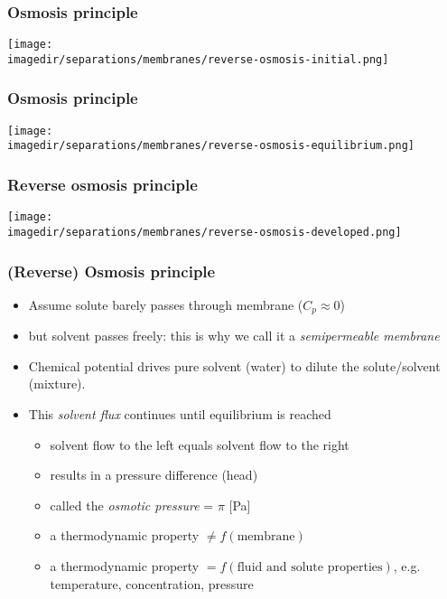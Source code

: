 \begin{frame}\frametitle{Osmosis principle}
	\vfill
	\begin{center}
		\texttt{[image: \\imagedir/separations/membranes/reverse-osmosis-initial.png]}
	\end{center}
\end{frame}

\begin{frame}\frametitle{Osmosis principle}
	\vfill
	\begin{center}
		\texttt{[image: \\imagedir/separations/membranes/reverse-osmosis-equilibrium.png]}
	\end{center}
\end{frame}

\begin{frame}\frametitle{\textbf{{\color{myOrange}Reverse}} osmosis principle}
	\vfill
	\begin{center}
		\texttt{[image: \\imagedir/separations/membranes/reverse-osmosis-developed.png]}
	\end{center}
\end{frame}

\begin{frame}\frametitle{(Reverse) Osmosis principle}
	\begin{itemize}
		\item	Assume solute barely passes through membrane ($C_p \approx 0$)
		\item	but solvent passes freely: this is why we call it a {\color{purple}\emph{semipermeable membrane}}
		\item	Chemical potential drives pure solvent (water) to dilute the solute/solvent (mixture).
		\item	This \emph{solvent flux} continues until equilibrium is reached
			\begin{itemize}
				\item	solvent flow to the left equals solvent flow to the right
				\item	results in a pressure difference (head)
				\item	called the \emph{osmotic pressure} = $\pi$ [Pa]
				\item	a thermodynamic property $\neq f(\text{membrane})$
				\item	a thermodynamic property $= f(\text{fluid and solute properties})$, e.g. {\color{myOrange}temperature, concentration, pressure}
			\end{itemize}
	\end{itemize}
\end{frame}

